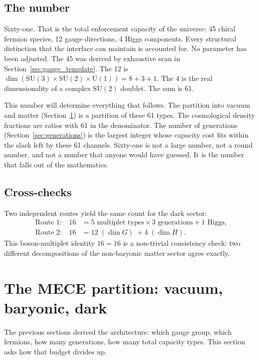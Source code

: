 \documentclass[11pt]{article}
\newcommand{\SU}{\mathrm{SU}}
\newcommand{\U}{\mathrm{U}}
\begin{document}
\subsection{The number}

Sixty-one.  That is the total enforcement capacity of the universe: 45 chiral fermion species, 12 gauge directions, 4 Higgs components.  Every structural distinction that the interface can maintain is accounted for.  No parameter has been adjusted.  The 45 was derived by exhaustive scan in Section~\ref{sec:gauge_template}.  The 12 is $\dim(\SU(3) \times \SU(2) \times \U(1)) = 8 + 3 + 1$.  The 4 is the real dimensionality of a complex $\SU(2)$ doublet.  The sum is 61.

This number will determine everything that follows.  The partition into vacuum and matter (Section~\ref{sec:partition}) is a partition of these 61 types.  The cosmological density fractions are ratios with 61 in the denominator.  The number of generations (Section~\ref{sec:generations}) is the largest integer whose capacity cost fits within the slack left by these 61 channels.  Sixty-one is not a large number, not a round number, and not a number that anyone would have guessed.  It is the number that falls out of the mathematics.

\subsection{Cross-checks}

Two independent routes yield the same count for the dark sector:
\begin{align}
\text{Route 1:} \quad 16 &= 5 \text{ multiplet types} \times 3 \text{ generations} + 1 \text{ Higgs}, \\
\text{Route 2:} \quad 16 &= 12 \;(\dim G) \;+ 4 \;(\dim H).
\end{align}
This boson-multiplet identity $16 = 16$ is a non-trivial consistency check: two different decompositions of the non-baryonic matter sector agree exactly.


\section{The MECE partition: vacuum, baryonic, dark}
\label{sec:partition}

The previous sections derived the architecture: which gauge group, which fermions, how many generations, how many total capacity types.  This section asks how that budget divides up.
\end{document}
